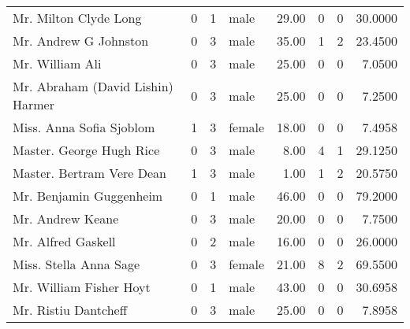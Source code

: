 \begin{tabular}{lrrlrrrr}
Mr. Milton Clyde Long                              &         0 &       1 &    male &  29.00 &                        0 &                        0 &   30.0000 \\
Mr. Andrew G Johnston                              &         0 &       3 &    male &  35.00 &                        1 &                        2 &   23.4500 \\
Mr. William Ali                                    &         0 &       3 &    male &  25.00 &                        0 &                        0 &    7.0500 \\
Mr. Abraham (David Lishin) Harmer                  &         0 &       3 &    male &  25.00 &                        0 &                        0 &    7.2500 \\
Miss. Anna Sofia Sjoblom                           &         1 &       3 &  female &  18.00 &                        0 &                        0 &    7.4958 \\
Master. George Hugh Rice                           &         0 &       3 &    male &   8.00 &                        4 &                        1 &   29.1250 \\
Master. Bertram Vere Dean                          &         1 &       3 &    male &   1.00 &                        1 &                        2 &   20.5750 \\
Mr. Benjamin Guggenheim                            &         0 &       1 &    male &  46.00 &                        0 &                        0 &   79.2000 \\
Mr. Andrew Keane                                   &         0 &       3 &    male &  20.00 &                        0 &                        0 &    7.7500 \\
Mr. Alfred Gaskell                                 &         0 &       2 &    male &  16.00 &                        0 &                        0 &   26.0000 \\
Miss. Stella Anna Sage                             &         0 &       3 &  female &  21.00 &                        8 &                        2 &   69.5500 \\
Mr. William Fisher Hoyt                            &         0 &       1 &    male &  43.00 &                        0 &                        0 &   30.6958 \\
Mr. Ristiu Dantcheff                               &         0 &       3 &    male &  25.00 &                        0 &                        0 &    7.8958 \\

\end{tabular}

